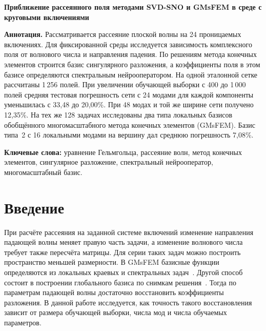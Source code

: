 \documentclass[11pt,a4paper]{article}
\begin{document}
\begin{center}
{\Large\bfseries Приближение рассеянного поля методами SVD-SNO и GMsFEM в среде с круговыми включениями\par}
\end{center}

\noindent\textbf{Аннотация.}
Рассматривается рассеяние плоской волны на 24 проницаемых включениях. Для фиксированной среды исследуется зависимость комплексного поля от волнового числа и направления падения. По решениям метода конечных элементов строится базис сингулярного разложения, а коэффициенты поля в этом базисе определяются спектральным нейрооператором. На одной эталонной сетке рассчитаны 1\,256 полей. При увеличении обучающей выборки с 400 до 1\,000 полей средняя тестовая погрешность сети с 24 модами для каждой компоненты уменьшилась с 33,48 до 20,00\%. При 48 модах и той же ширине сети получено 12,35\%. На тех же 128 задачах исследованы два типа локальных базисов обобщённого многомасштабного метода конечных элементов (GMsFEM). Базис типа~2 с 16 локальными модами на вершину дал среднюю погрешность 7,08\%.

\smallskip\noindent\textbf{Ключевые слова:} уравнение Гельмгольца, рассеяние волн, метод конечных элементов, сингулярное разложение, спектральный нейрооператор, многомасштабный базис.

\section*{Введение}
При расчёте рассеяния на заданной системе включений изменение направления падающей волны меняет правую часть задачи, а изменение волнового числа требует также пересчёта матрицы. Для серии таких задач можно построить пространство меньшей размерности. В GMsFEM базисные функции определяются из локальных краевых и спектральных задач~\cite{kalachikova}. Другой способ состоит в построении глобального базиса по снимкам решения~\cite{sirovich}. Тогда по параметрам падающей волны достаточно восстановить коэффициенты разложения. В данной работе исследуется, как точность такого восстановления зависит от размера обучающей выборки, числа мод и числа обучаемых параметров.
\end{document}
